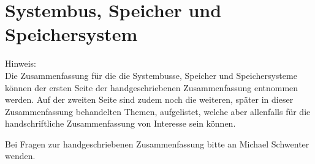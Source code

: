 \section{Systembus, Speicher und Speichersystem}
Hinweis:\\
Die Zusammenfassung für die die Systembusse, Speicher und Speichersysteme können der ersten Seite der handgeschriebenen Zusammenfassung entnommen werden. Auf der zweiten Seite sind zudem noch die weiteren, später in dieser Zusammenfassung behandelten Themen, aufgelistet, welche aber allenfalls für die handschriftliche Zusammenfassung von Interesse sein können.

Bei Fragen zur handgeschriebenen Zusammenfassung bitte an Michael Schwenter \frqq{} wenden.



